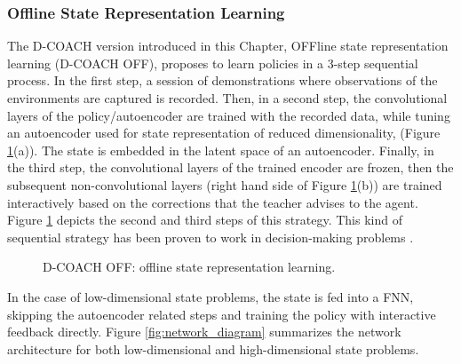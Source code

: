\subsubsection{Offline State Representation Learning}
The D-COACH version introduced in this Chapter, OFFline state representation learning (D-COACH OFF), proposes to learn policies in a 3-step sequential process. In the first step, a session of demonstrations where observations of the environments are captured is recorded. Then, in a second step, the convolutional layers of the policy/autoencoder are trained with the recorded data, while tuning an  autoencoder  used  for state representation of reduced dimensionality, (Figure \ref{fig:ms}(a)). The state is embedded in the latent space of an autoencoder. Finally, in the third step, the convolutional layers of the trained encoder are frozen, then the subsequent non-convolutional layers (right hand side of Figure \ref{fig:ms}(b)) are trained interactively based on the corrections that the teacher advises to the agent. Figure \ref{fig:ms} depicts the second and third steps of this strategy. This kind of sequential strategy has been proven to work in decision-making problems \cite{Warnell2017,Finn2015,Ha2018}.

\begin{figure}[h]
\centering
{}
\hspace{0.1cm}
\caption{D-COACH OFF: offline state representation learning.} 
\label{fig:ms} 
\end{figure}

In the case of low-dimensional state problems, the state is fed into a FNN, skipping the autoencoder related steps and training the policy with interactive feedback directly. Figure \ref{fig:network_diagram} summarizes the network architecture for both low-dimensional and high-dimensional state problems.

